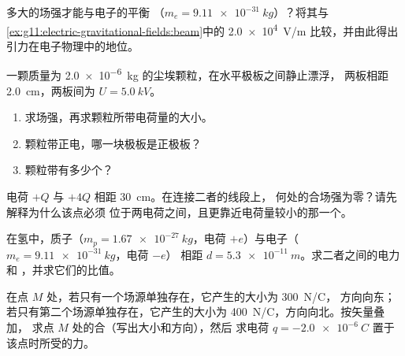 \begin{exercise}[$\star\star$]\label{exo:g11:electric-gravitational-fields:7}
多大的场强才能与电子的平衡
（$m_e = \qty{9.11e-31}{kg}$）？将其与
\cref{ex:g11:electric-gravitational-fields:beam}中的 \qty{2.0e4}{V/m} 比较，并由此得出
引力在电子物理中的地位。
\end{exercise}

\begin{exercise}[$\star\star$]\label{exo:g11:electric-gravitational-fields:8}
一颗质量为 \qty{2.0e-6}{kg} 的尘埃颗粒，在水平极板之间静止漂浮，
两板相距 \qty{2.0}{cm}，两板间为 $U = \qty{5.0}{kV}$。
\begin{enumerate}
  \item 求场强，再求颗粒所带电荷量的大小。
  \item 颗粒带正电，哪一块极板是正极板？
  \item 颗粒带有多少个？
\end{enumerate}
\end{exercise}

\begin{exercise}[$\star\star$]\label{exo:g11:electric-gravitational-fields:9}
电荷 $+Q$ 与 $+4Q$ 相距 \qty{30}{cm}。在连接二者的线段上，
何处的合场强为零？请先解释为什么该点必须
位于两电荷之间，且更靠近电荷量较小的那一个。
\end{exercise}

\begin{exercise}[$\star\star$]\label{exo:g11:electric-gravitational-fields:10}
在氢中，质子（$m_p = \qty{1.67e-27}{kg}$，电荷
$+e$）与电子（$m_e = \qty{9.11e-31}{kg}$，电荷 $-e$）
相距 $d = \qty{5.3e-11}{m}$。求二者之间的电力和
，并求它们的比值。
\end{exercise}

\begin{exercise}[$\star\star$]\label{exo:g11:electric-gravitational-fields:11}
在点 $M$ 处，若只有一个场源单独存在，它产生的大小为 \qty{300}{N/C}，
方向向东；若只有第二个场源单独存在，它产生的大小为 \qty{400}{N/C}，方向向北。按矢量叠加，
求点 $M$ 处的合（写出大小和方向），然后
求电荷 $q = \qty{-2.0e-6}{C}$ 置于该点时所受的力。
\end{exercise}

